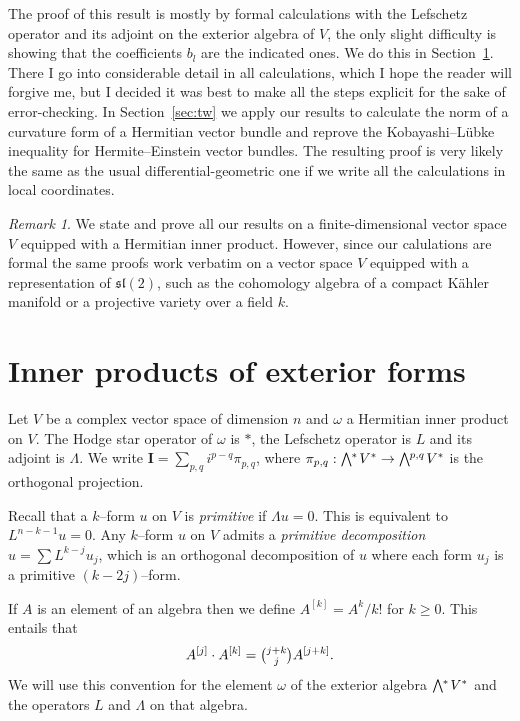 \documentclass[11pt,a4paper]{amsart}
\def\^#1{^{[#1]}}
\def\bw#1{\bigwedge{}^{\mkern-5mu #1}\mkern2mu}
\def\I{\mathbf{I}}
\theoremstyle{definition}
\theoremstyle{remark}
\newtheorem*{rema}{Remark}
\numberwithin{equation}{section}
\begin{document}
The proof of this result is mostly by formal calculations with the
Lefschetz operator and its adjoint on the exterior algebra of $V$, the
only slight difficulty is showing that the coefficients $b_l$ are the
indicated ones. We do this in Section~\ref{sec:on}. There I go into
considerable detail in all calculations, which I hope the reader will
forgive me, but I decided it was best to make all the steps explicit for
the sake of error-checking.  In Section~\ref{sec:tw} we apply our results to
calculate the norm of a curvature form of a Hermitian vector bundle and
reprove the Kobayashi--L\"{u}bke inequality for Hermite--Einstein vector
bundles. The resulting proof is very likely the same as the usual
differential-geometric one if we write all the calculations in local
coordinates.

\begin{rema}
We state and prove all our results on a
finite-dimensional vector space $V$ equipped with a Hermitian inner
product. However, since our calulations are formal the same proofs work 
verbatim on a vector space $V$ equipped with a representation of
$\mathfrak{sl}(2)$, such as the cohomology algebra of a compact
K\"ahler manifold or a projective variety over a field $k$.
\end{rema}





\section{Inner products of exterior forms}
\label{sec:on}



Let $V$ be a complex vector space of dimension $n$ and $\omega$ a Hermitian
inner product on $V$. The Hodge star operator of $\omega$ is $*$,
the Lefschetz operator is $L$ and its adjoint is $\Lambda$. We write
$\I = \sum_{p,q} i^{p-q} \pi_{p,q}$, where $\pi_{p,q} : \bw{*} V^* \to
\bw{p,q} V^*$ is the orthogonal projection.

Recall that a $k$--form $u$ on $V$ is \emph{primitive} if $\Lambda u = 0$.
This is equivalent to $L^{n-k-1}u = 0$. Any $k$--form $u$ on $V$ admits a
\emph{primitive decomposition} $u = \sum L^{k-j} u_j$, which is an
orthogonal decomposition of $u$ where each form $u_j$ is a primitive
$(k-2j)$--form.

If $A$ is an element of an algebra then we define $A\^k = A^k / k!$ for $k
\geq 0$. This entails that
$$
A\^j \cdot A\^k = \tbinom{j+k}{j} A\^{j+k}.
$$
We will use this convention for the element $\omega$ of the exterior
algebra $\bw{*} V^*$ and the operators $L$ and $\Lambda$ on that
algebra.
\end{document}
